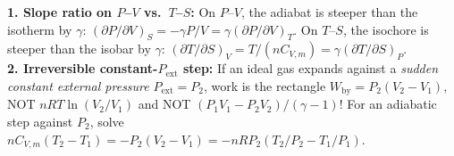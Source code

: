\begin{quicksheet}
\begin{center}
\label{fig:01:pv-atlas}
\end{center}
\begin{trapbox}
\textbf{1. Slope ratio on $P$--$V$ vs.\ $T$--$S$:}
On $P$--$V$, the adiabat is steeper than the isotherm by $\gamma$: $(\partial P/\partial V)_S = -\gamma P/V = \gamma(\partial P/\partial V)_T$.
On $T$--$S$, the isochore is steeper than the isobar by $\gamma$: $(\partial T/\partial S)_V = T/(nC_{V,m}) = \gamma(\partial T/\partial S)_P$.\\
\textbf{2. Irreversible constant-$P_{\mathrm{ext}}$ step:}
If an ideal gas expands against a \emph{sudden constant external pressure} $P_{\mathrm{ext}} = P_2$, work is the rectangle $W_{\mathrm{by}} = P_2(V_2 - V_1)$, NOT $nRT\ln(V_2/V_1)$ and NOT $(P_1V_1-P_2V_2)/(\gamma-1)$! For an adiabatic step against $P_2$, solve $nC_{V,m}(T_2-T_1) = -P_2(V_2-V_1) = -nR P_2(T_2/P_2 - T_1/P_1)$.
\end{trapbox}
\end{quicksheet}

